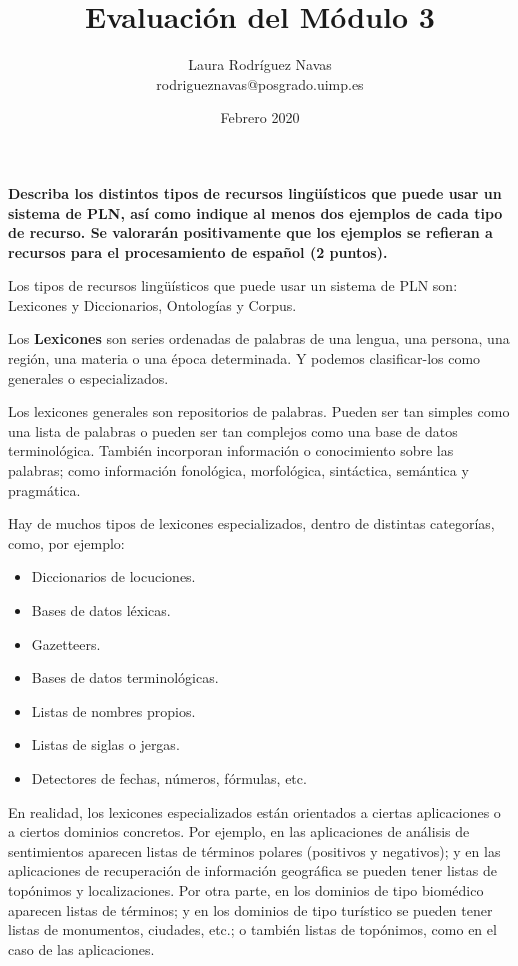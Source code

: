 \documentclass[11pt]{exam}
\title{Evaluación del Módulo 3}
\author{Laura Rodríguez Navas \\ rodrigueznavas@posgrado.uimp.es}
\date{Febrero 2020}
\begin{document}
\maketitle

\begin{questions}
	
{\bf \question Describa los distintos tipos de recursos lingüísticos que puede usar un sistema de PLN, así como indique al menos dos ejemplos de cada tipo de recurso. Se valorarán positivamente que los ejemplos se refieran a recursos para el procesamiento de español (2 puntos).}

Los tipos de recursos lingüísticos que puede usar un sistema de PLN son: Lexicones y Diccionarios, Ontologías y Corpus.

Los {\bf Lexicones} son series ordenadas de palabras de una lengua, una persona, una región, una materia o una época determinada. Y podemos clasificar-los como generales o especializados.

Los lexicones generales son repositorios de palabras. Pueden ser tan simples como una lista de palabras o pueden ser tan complejos como una base de datos terminológica. También incorporan información o conocimiento sobre las palabras; como información fonológica, morfológica, sintáctica, semántica y pragmática.

Hay de muchos tipos de lexicones especializados, dentro de distintas categorías, como, por ejemplo:

\begin{itemize}
	\item Diccionarios de locuciones.
	\item Bases de datos léxicas.
	\item Gazetteers.
	\item Bases de datos terminológicas.
	\item Listas de nombres propios.
	\item Listas de siglas o jergas.
	\item Detectores de fechas, números, fórmulas, etc.
\end{itemize}

En realidad, los lexicones especializados están orientados a ciertas aplicaciones o a ciertos dominios concretos. Por ejemplo, en las aplicaciones de análisis de sentimientos aparecen listas de términos polares (positivos y negativos); y en las aplicaciones de recuperación de información geográfica se pueden tener listas de topónimos y localizaciones. Por otra parte, en los dominios de tipo biomédico aparecen listas de términos; y en los dominios de tipo turístico se pueden tener listas de monumentos, ciudades, etc.; o también listas de topónimos, como en el caso de las aplicaciones.


\end{questions}
\end{document}
